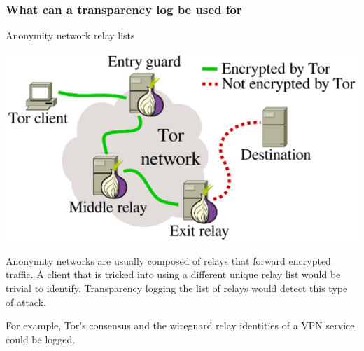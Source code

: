 \begin{frame}
  \frametitle{What can a transparency log be used for}

  \centerline{Anonymity network relay lists}

  \centerline{\includegraphics[scale=.1]{img/tor-network}}
  \pause

  Anonymity networks are usually composed of relays that forward
  encrypted traffic. A client that is tricked into using a different
  unique relay list would be trivial to identify. Transparency
  logging the list of relays would detect this type of attack.

  For example, Tor's consensus and the wireguard relay identities of a
  VPN service could be logged.
\end{frame}

